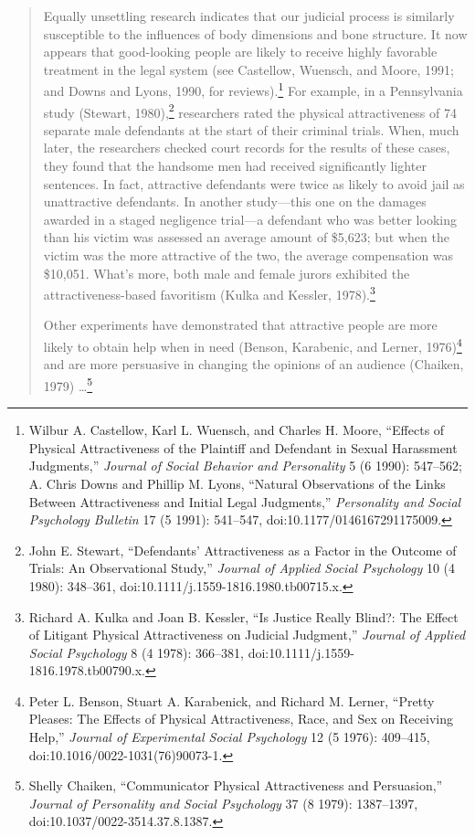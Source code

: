 \begin{quotation}
{
 Equally unsettling research indicates that our judicial process is
similarly susceptible to the influences of body dimensions and bone
structure. It now appears that good-looking people are likely to
receive highly favorable treatment in the legal system (see Castellow,
Wuensch, and Moore, 1991; and Downs and Lyons, 1990, for
reviews).\footnote{Wilbur A. Castellow, Karl L. Wuensch, and Charles H. Moore,
``Effects of Physical Attractiveness of the Plaintiff
and Defendant in Sexual Harassment Judgments,''
\textit{Journal of Social Behavior and Personality} 5 (6 1990):
547--562; A. Chris Downs and Phillip M. Lyons,
``Natural Observations of the Links Between
Attractiveness and Initial Legal Judgments,''
\textit{Personality and Social Psychology Bulletin} 17 (5 1991):
541--547, doi:10.1177/0146167291175009.} For example, in a Pennsylvania study
(Stewart, 1980),\footnote{John E. Stewart, ``Defendants'
Attractiveness as a Factor in the Outcome of Trials: An Observational
Study,'' \textit{Journal of Applied Social
Psychology} 10 (4 1980): 348--361,
doi:10.1111/j.1559-1816.1980.tb00715.x.} researchers rated the physical
attractiveness of 74 separate male defendants at the start of their
criminal trials. When, much later, the researchers checked court
records for the results of these cases, they found that the handsome
men had received significantly lighter sentences. In fact, attractive
defendants were twice as likely to avoid jail as unattractive
defendants. In another study---this one on the damages awarded in a
staged negligence trial---a defendant who was better looking than his
victim was assessed an average amount of \$5,623; but when the victim
was the more attractive of the two, the average compensation was
\$10,051. What's more, both male and female jurors
exhibited the attractiveness-based favoritism (Kulka and Kessler,
1978).\footnote{Richard A. Kulka and Joan B. Kessler, ``Is
Justice Really Blind?: The Effect of Litigant Physical Attractiveness
on Judicial Judgment,'' \textit{Journal of Applied
Social Psychology} 8 (4 1978): 366--381,
doi:10.1111/j.1559-1816.1978.tb00790.x.}}

{
 Other experiments have demonstrated that attractive people are
more likely to obtain help when in need (Benson, Karabenic, and Lerner,
1976)\footnote{Peter L. Benson, Stuart A. Karabenick, and Richard M. Lerner,
``Pretty Pleases: The Effects of Physical
Attractiveness, Race, and Sex on Receiving Help,''
\textit{Journal of Experimental Social Psychology} 12 (5 1976):
409--415, doi:10.1016/0022-1031(76)90073-1.} and are more persuasive in changing the
opinions of an audience (Chaiken, 1979) \ldots\footnote{Shelly Chaiken, ``Communicator Physical
Attractiveness and Persuasion,'' \textit{Journal of
Personality and Social Psychology} 37 (8 1979): 1387--1397,
doi:10.1037/0022-3514.37.8.1387.}}
\end{quotation}

